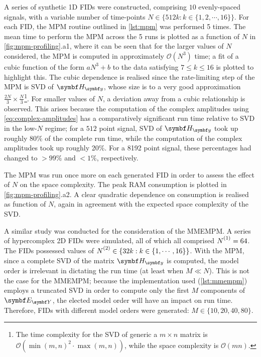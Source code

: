 A series of synthetic \ac{1D} \acp{FID} were constructed, comprising $10$ evenly-spaced
signals, with a
variable number of time-points $N \in \lbrace 512k : k \in \lbrace 1, 2, \cdots, 16 \rbrace \rbrace$.
For each \ac{FID}, the \ac{MPM} routine outlined in \cref{lst:mpm} was
performed 5 times.
The mean time to perform the \ac{MPM} across the 5 runs is plotted as a function
of $N$ in \cref{fig:mpm-profiling}.a1, where it can be seen that for
the larger values of $N$ considered, the \ac{MPM} is computed in approximately
$\mathcal{O}({N}^3)$ time;
a fit of a cubic function of the form $aN^3 + b$ to the data satisfying $7 \leq
k \leq 16$ is plotted to highlight this.
The cubic dependence is realised since the rate-limiting step of the
\ac{MPM} is \ac{SVD} of $\Hy$, whose size is to a very good approximation
$\tfrac{2N}{3} \times \tfrac{N}{3}$\footnote{
    \label{fn:svd-complexity}
    The time complexity for the \ac{SVD} of generic a $m \times n$ matrix is
    $\mathcal{O}(\operatorname{min}(m, n)^2 \cdot \operatorname{max}(m, n))$,
    while the space complexity is $\mathcal{O}(mn)$.
}. For smaller values of $N$, a deviation
away from a cubic relationship is observed.
This arises because the computation of the complex amplitudes using
\cref{eq:complex-amplitudes} has a comparatively significant run time
relative to \ac{SVD} in the low-$N$ regime;
for a $512$ point signal, \ac{SVD} of $\Hy$ took up roughly 80\% of the
complete run time, while the computation of the complex amplitudes took up
roughly 20\%. For a 8192 point signal, these percentages had changed to
$>\!\!99\%$ and $<\!\!1\%$, respectively.

The \ac{MPM} was run once more on each generated \ac{FID} in order to assess
the effect of $N$ on the space complexity.
The peak \ac{RAM} consumption is plotted in \cref{fig:mpm-profiling}.a2.
A clear quadratic dependence on consumption is realised as function of $N$,
again in agreement with the expected space complexity of the
\ac{SVD}.

A similar study was conducted for the consideration of the \ac{MMEMPM}. A
series of hypercomplex \ac{2D} \acp{FID} were simulated, all of which all
comprised $\None = 64$. The \acp{FID} possessed values of $\Ntwo \in \lbrace
32k : k \in \lbrace 1, \cdots, 16 \rbrace \rbrace$.
With the \ac{MPM}, since a complete \ac{SVD} of the matrix $\Hy$ is computed,
the model order is irrelevant in dictating the run time (at least when $M \ll
N$). This is not the case for the \ac{MMEMPM}; because the \Python
implementation used (\cref{lst:mmempm}) employs a truncated \ac{SVD} in order
to compute only the first $M$ components of $\EY$, the elected model order will
have an impact on run time.  Therefore, \acp{FID} with different model orders
were generated: $M \in \lbrace 10, 20, 40, 80 \rbrace$.

